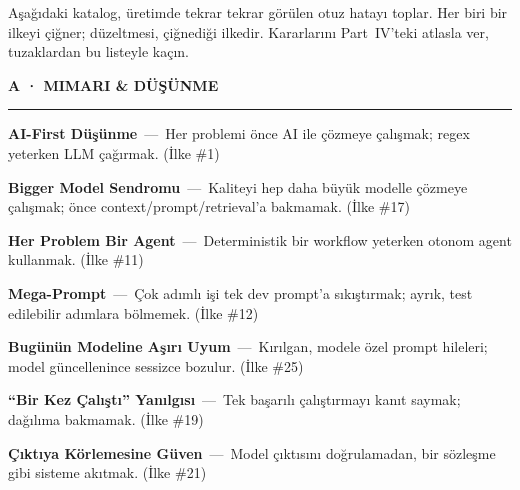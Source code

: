 

Aşağıdaki katalog, üretimde tekrar tekrar görülen otuz hatayı toplar. Her biri
bir ilkeyi çiğner; düzeltmesi, çiğnediği ilkedir. Kararlarını Part~IV'teki
atlasla ver, tuzaklardan bu listeyle kaçın.

\newcommand{\anti}[3]{%
  \par\vspace{2.5pt}\noindent\hangindent=8mm\hangafter=0
  \makebox[6mm][l]{\sffamily\bfseries\small\color{warn}#1}%
  \textbf{#2} \,—\, #3\par}
\newcommand{\antigroup}[1]{%
  \vspace{7pt}\par\noindent
  {\sffamily\bfseries\footnotesize\color{accentdk}\MakeUppercase{#1}}\par
  \vspace{-1pt}\textcolor{hairline}{\rule{\linewidth}{0.6pt}}}

\antigroup{A · Mimari \& Düşünme}
\anti{1}{AI-First Düşünme}{Her problemi önce AI ile çözmeye çalışmak; regex yeterken LLM çağırmak. {\scriptsize\color{softgray}(İlke \#1)}}
\anti{2}{Bigger Model Sendromu}{Kaliteyi hep daha büyük modelle çözmeye çalışmak; önce context/prompt/retrieval'a bakmamak. {\scriptsize\color{softgray}(İlke \#17)}}
\anti{3}{Her Problem Bir Agent}{Deterministik bir workflow yeterken otonom agent kullanmak. {\scriptsize\color{softgray}(İlke \#11)}}
\anti{4}{Mega-Prompt}{Çok adımlı işi tek dev prompt'a sıkıştırmak; ayrık, test edilebilir adımlara bölmemek. {\scriptsize\color{softgray}(İlke \#12)}}
\anti{5}{Bugünün Modeline Aşırı Uyum}{Kırılgan, modele özel prompt hileleri; model güncellenince sessizce bozulur. {\scriptsize\color{softgray}(İlke \#25)}}
\anti{6}{``Bir Kez Çalıştı'' Yanılgısı}{Tek başarılı çalıştırmayı kanıt saymak; dağılıma bakmamak. {\scriptsize\color{softgray}(İlke \#19)}}
\anti{7}{Çıktıya Körlemesine Güven}{Model çıktısını doğrulamadan, bir sözleşme gibi sisteme akıtmak. {\scriptsize\color{softgray}(İlke \#21)}}


